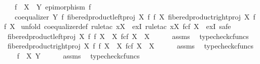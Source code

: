 \begin{isabellebody}
\ \ \ {\isachardoublequoteopen}f\ {\isacharcolon}{\kern0pt}\ X\ {\isasymrightarrow}\ Y{\isachardoublequoteclose}\ {\isachardoublequoteopen}epimorphism\ f{\isachardoublequoteclose}\isanewline
\ \ \ {\isachardoublequoteopen}coequalizer\ Y\ f\ {\isacharparenleft}{\kern0pt}fibered{\isacharunderscore}{\kern0pt}product{\isacharunderscore}{\kern0pt}left{\isacharunderscore}{\kern0pt}proj\ X\ f\ f\ X{\isacharparenright}{\kern0pt}\ {\isacharparenleft}{\kern0pt}fibered{\isacharunderscore}{\kern0pt}product{\isacharunderscore}{\kern0pt}right{\isacharunderscore}{\kern0pt}proj\ X\ f\ f\ X{\isacharparenright}{\kern0pt}{\isachardoublequoteclose}\isanewline
%
\isadelimproof
%
\endisadelimproof
%
\isatagproof
{}\isamarkupfalse%
\ {\isacharparenleft}{\kern0pt}unfold\ coequalizer{\isacharunderscore}{\kern0pt}def{\isacharcomma}{\kern0pt}\ rule{\isacharunderscore}{\kern0pt}tac\ x{\isacharequal}{\kern0pt}X\ \ exI{\isacharcomma}{\kern0pt}\ rule{\isacharunderscore}{\kern0pt}tac\ x{\isacharequal}{\kern0pt}{\isachardoublequoteopen}X\ \isactrlbsub f\isactrlesub {\isasymtimes}\isactrlsub c\isactrlbsub f\isactrlesub \ X{\isachardoublequoteclose}\ \ exI{\isacharcomma}{\kern0pt}\ safe{\isacharparenright}{\kern0pt}\isanewline
\ \ \isamarkupfalse%
\ {\isachardoublequoteopen}fibered{\isacharunderscore}{\kern0pt}product{\isacharunderscore}{\kern0pt}left{\isacharunderscore}{\kern0pt}proj\ X\ f\ f\ X\ {\isacharcolon}{\kern0pt}\ X\ \isactrlbsub f\isactrlesub {\isasymtimes}\isactrlsub c\isactrlbsub f\isactrlesub \ X\ {\isasymrightarrow}\ X{\isachardoublequoteclose}\isanewline
\ \ \ \ \isamarkupfalse%
\ assms\ \isamarkupfalse%
\ typecheck{\isacharunderscore}{\kern0pt}cfuncs\isanewline
\ \ \isamarkupfalse%
\ {\isachardoublequoteopen}fibered{\isacharunderscore}{\kern0pt}product{\isacharunderscore}{\kern0pt}right{\isacharunderscore}{\kern0pt}proj\ X\ f\ f\ X\ {\isacharcolon}{\kern0pt}\ X\ \isactrlbsub f\isactrlesub {\isasymtimes}\isactrlsub c\isactrlbsub f\isactrlesub \ X\ {\isasymrightarrow}\ X{\isachardoublequoteclose}\isanewline
\ \ \ \ \isamarkupfalse%
\ assms\ \isamarkupfalse%
\ typecheck{\isacharunderscore}{\kern0pt}cfuncs\isanewline
\ \ \isamarkupfalse%
\ {\isachardoublequoteopen}f\ {\isacharcolon}{\kern0pt}\ X\ {\isasymrightarrow}Y{\isachardoublequoteclose}\isanewline
\ \ \ \ \isamarkupfalse%
\ assms\ \isamarkupfalse%
\ typecheck{\isacharunderscore}{\kern0pt}cfuncs\isanewline

\end{isabellebody}
